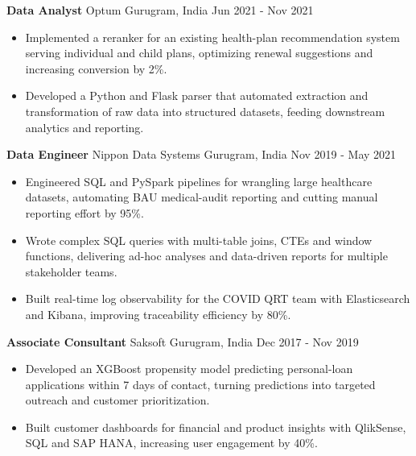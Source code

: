 \documentclass[10pt,a4paper]{article}
\newcommand{\role}[4]{\textbf{#1} \textbar{} #2 \hfill #3 \textbar{} #4\par}
\begin{document}
\vspace{3pt}
\role{Data Analyst}{Optum}{Gurugram, India}{Jun 2021 - Nov 2021}
\begin{itemize}
  \item Implemented a reranker for an existing health-plan recommendation system serving individual and child plans, optimizing renewal suggestions and increasing conversion by 2\%.
  \item Developed a Python and Flask parser that automated extraction and transformation of raw data into structured datasets, feeding downstream analytics and reporting.
\end{itemize}
\vspace{3pt}
\role{Data Engineer}{Nippon Data Systems}{Gurugram, India}{Nov 2019 - May 2021}
\begin{itemize}
  \item Engineered SQL and PySpark pipelines for wrangling large healthcare datasets, automating BAU medical-audit reporting and cutting manual reporting effort by 95\%.
  \item Wrote complex SQL queries with multi-table joins, CTEs and window functions, delivering ad-hoc analyses and data-driven reports for multiple stakeholder teams.
  \item Built real-time log observability for the COVID QRT team with Elasticsearch and Kibana, improving traceability efficiency by 80\%.
\end{itemize}
\vspace{3pt}
\role{Associate Consultant}{Saksoft}{Gurugram, India}{Dec 2017 - Nov 2019}
\begin{itemize}
  \item Developed an XGBoost propensity model predicting personal-loan applications within 7 days of contact, turning predictions into targeted outreach and customer prioritization.
  \item Built customer dashboards for financial and product insights with QlikSense, SQL and SAP HANA, increasing user engagement by 40\%.
\end{itemize}
\end{document}
